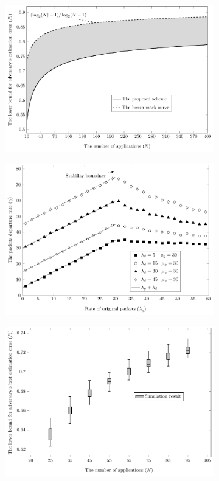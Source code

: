 \documentclass{CSICC2016}
\begin{document}
\begin{figure}
\centering
\begin{subfigure}[b]{0.31\textwidth}
\includegraphics[width=\linewidth]{./Images/famk}
\caption{}
\label{fig:gull}
\end{subfigure}
\begin{subfigure}[b]{0.31\textwidth}
\includegraphics[width=\linewidth]{./Images/saml}
\caption{}
\label{fig:tiger}
\end{subfigure}
\begin{subfigure}[b]{0.31\textwidth}
\includegraphics[width=\linewidth]{./Images/EntropyVersus}

\end{subfigure}
\end{figure}
\end{document}
